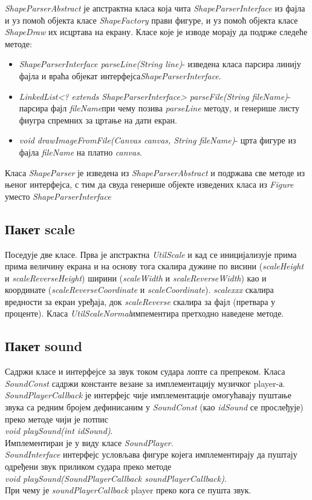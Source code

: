 \emph{ShapeParserAbstract} је апстрактна класа која чита \emph{ShapeParserInterface} из фајла и уз помоћ објекта класе \emph{ShapeFactory} прави фигуре, и уз помоћ објекта класе \emph{ShapeDraw} их исцртава на екрану. Класе које је изводе морају да подрже следеће методе:
\begin{itemize}
\item \emph{ShapeParserInterface parseLine(String line)}- изведена класа парсира линију фајла и враћа објекат интерфејса\emph{ShapeParserInterface}.
\item \emph{LinkedList<? extends ShapeParserInterface> parseFile(String fileName)}-парсира фајл \emph{fileName}при чему позива \emph{parseLine} методу, и генерише листу фиугра спремних за цртање на дати екран.
\item \emph{void drawImageFromFile(Canvas canvas, String fileName)}- црта фигуре из фајла \emph{fileName} на платно \emph{canvas}.
\end{itemize}

Класа \emph{ShapeParser} је изведена из \emph{ShapeParserAbstract} и подржава све методе из њеног интерфејса, с тим да свуда генерише објекте изведених класа из \emph{Figure} уместо \emph{ShapeParserInterface}

\subsection{Пакет scale}
Поседује две класе. Прва је апстрактна \emph{UtilScale} и кад се иницијализује прима прима величину екрана и на основу тога скалира дужине по висини (\emph{scaleHeight} и \emph{scaleReverseHeight}) ширини (\emph{scaleWidth} и \emph{scaleReverseWidth}) као и координате (\emph{scaleReverseCoordinate} и \emph{scaleCoordinate}). \emph{scalexxx} скалира вредности за екран уређаја, док \emph{scaleReverse} скалира за фајл (претвара у проценте). Класа \emph{UtilScaleNormal}импементира претходно наведене методе.
\subsection{Пакет sound}
Садржи класе и интерфејсе за звук током судара лопте са препреком. Класа \emph{SoundConst} садржи  константе везане за имплементацију музичког player-а. \emph{SoundPlayerCallback} је интерфејс чије имплементације омогућавају пуштање звука са редним бројем дефинисаним у \emph{SoundConst} (као \emph{idSound} се прослеђује) преко методе чији је потпис 
\\  \indent \emph{void playSound(int idSound)}.\\  Имплементиран је у виду класе \emph{SoundPlayer}.
\\ \indent
\emph{SoundInterface} интерфејс условљава фигуре којега имплементирају да пуштају одређени звук приликом судара преко методе\\ \indent  \emph{void playSound(SoundPlayerCallback soundPlayerCallback)}.\\
При чему је \emph{soundPlayerCallback} player преко кога се пушта звук.

 
 